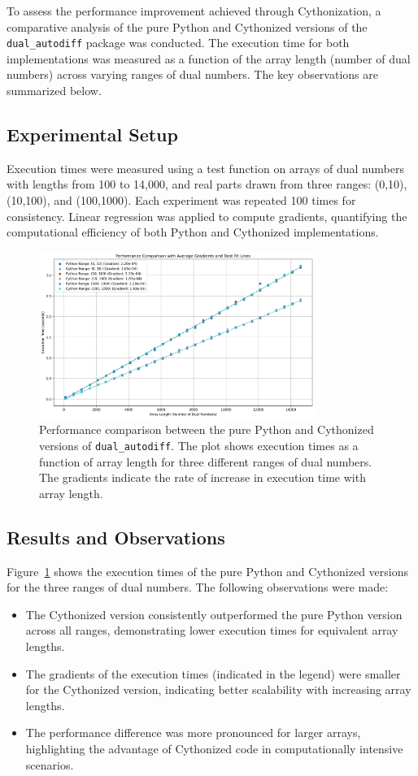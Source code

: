 \documentclass[a4paper,12pt]{article}
\begin{document}
To assess the performance improvement achieved through Cythonization, a comparative analysis of the pure Python and Cythonized versions of the \texttt{dual\_autodiff} package was conducted. The execution time for both implementations was measured as a function of the array length (number of dual numbers) across varying ranges of dual numbers. The key observations are summarized below.

\subsection{Experimental Setup}
Execution times were measured using a test function on arrays of dual numbers with lengths from 100 to 14,000, and real parts drawn from three ranges: 
(0,10), (10,100), and (100,1000). Each experiment was repeated 100 times for consistency. Linear regression was applied to compute gradients, quantifying the computational efficiency of both Python and Cythonized implementations.
\begin{figure}[h!]
    \centering
    \includegraphics[width=0.8\textwidth]{performance_comparison.png}
    \caption{Performance comparison between the pure Python and Cythonized versions of \texttt{dual\_autodiff}. The plot shows execution times as a function of array length for three different ranges of dual numbers. The gradients indicate the rate of increase in execution time with array length.}
    \label{fig:performance_comparison}
\end{figure}

\subsection{Results and Observations}
Figure~\ref{fig:performance_comparison} shows the execution times of the pure Python and Cythonized versions for the three ranges of dual numbers. The following observations were made:
\begin{itemize}
    \item The Cythonized version consistently outperformed the pure Python version across all ranges, demonstrating lower execution times for equivalent array lengths.
    \item The gradients of the execution times (indicated in the legend) were smaller for the Cythonized version, indicating better scalability with increasing array lengths.
    \item The performance difference was more pronounced for larger arrays, highlighting the advantage of Cythonized code in computationally intensive scenarios.
\end{itemize}
\end{document}
